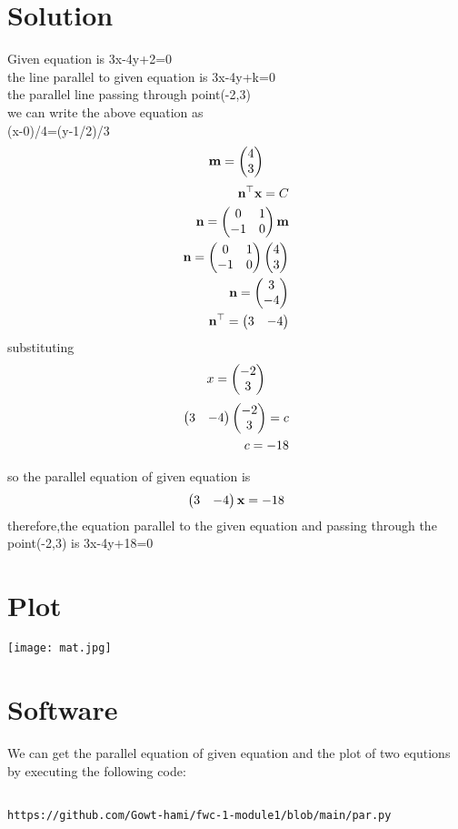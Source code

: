  \section{Solution}
 \begin{center}
 Given equation is 3x-4y+2=0
 \\the line parallel to given equation is 3x-4y+k=0
\\the parallel line passing through point(-2,3) 
        \\ we can write the above equation as
          \\ (x-0)/4=(y-1/2)/3
             \\\begin{align}
\textbf{m}=\begin{pmatrix}4\\ 3\end{pmatrix}
\end{align}
\begin{align}
  \textbf{n}^{\top}\textbf{x}={C}
\\ \textbf{n}=\begin{pmatrix}0 & 1 \\ -1 & 0\end{pmatrix} \textbf{m}
\\ \textbf{n}= \begin{pmatrix}0 & 1 \\ -1 & 0\end{pmatrix} \begin{pmatrix}4\\ 3\end{pmatrix}
\\ \textbf{n}=\begin{pmatrix}3\\ -4\end{pmatrix}
\\ \textbf{n}^{\top}=\begin{pmatrix}3 & -4\end{pmatrix}
\end{align}
substituting
\begin{align}
x=\begin{pmatrix}-2\\3\end{pmatrix}
\end{align}
\begin{align}
\begin{pmatrix}3&-4\end{pmatrix}\begin{pmatrix}-2\\3\end{pmatrix}=c\\
c=-18
\end{align}

so the parallel equation of given equation is 
\begin{align}
\begin{pmatrix}3 & -4\end{pmatrix}\textbf{x}=-18
\end{align}
  therefore,the equation parallel to the given equation and passing through the point(-2,3) is 3x-4y+18=0
 \end{center}
 \section{Plot}
         \centering
        \texttt{[image: mat.jpg]}
  \section{Software}
  We can get the parallel equation of given equation and the plot of two equtions by executing the following code:
 \vspace{3mm} 
\begin{lstlisting}

https://github.com/Gowt-hami/fwc-1-module1/blob/main/par.py
\end{lstlisting}

